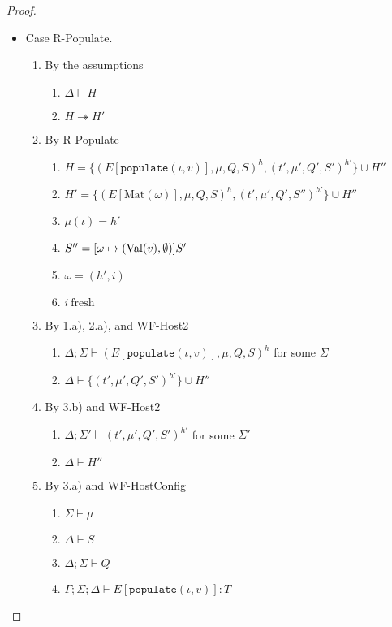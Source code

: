 \begin{proof}
\begin{itemize}
\item Case R-Populate.
\begin{enumerate}
\item By the assumptions
  \begin{enumerate}[label=(\alph*)]
  \item $\Delta \vdash H$
  \item $H \twoheadrightarrow H'$
  \end{enumerate}
\item By R-Populate
  \begin{enumerate}[label=(\alph*)]
  \item $H = \{ (E[\texttt{populate}(\iota, v)], \mu, Q, S)^h, (t', \mu', Q', S')^{h'} \} \cup H''$
  \item $H' = \{ (E[\text{Mat}(\omega)], \mu, Q, S)^h, (t', \mu', Q', S'')^{h'} \} \cup H''$
  \item $\mu(\iota) = h'$
  \item $S''        = [\omega \mapsto ({\textrm{Val}(v)}, \emptyset)]S'$
  \item $\omega     = (h', i)$
  \item $i~\text{fresh}$
  \end{enumerate}
\item By 1.a), 2.a), and WF-Host2
  \begin{enumerate}[label=(\alph*)]
  \item $\Delta ; \Sigma \vdash (E[\texttt{populate}(\iota, v)], \mu, Q, S)^h$ for some $\Sigma$
  \item $\Delta \vdash \{ (t', \mu', Q', S')^{h'} \} \cup H''$
  \end{enumerate}
\item By 3.b) and WF-Host2
  \begin{enumerate}[label=(\alph*)]
  \item $\Delta ; \Sigma' \vdash (t', \mu', Q', S')^{h'}$ for some $\Sigma'$
  \item $\Delta \vdash H''$
  \end{enumerate}
\item By 3.a) and WF-HostConfig
  \begin{enumerate}[label=(\alph*)]
  \item $\Sigma \vdash \mu$
  \item $\Delta \vdash S$
  \item $\Delta ; \Sigma \vdash Q$
  \item $\Gamma ; \Sigma ; \Delta \vdash E[\texttt{populate}(\iota, v)] : T$

\end{enumerate}
\end{enumerate}
\end{itemize}
\end{proof}
